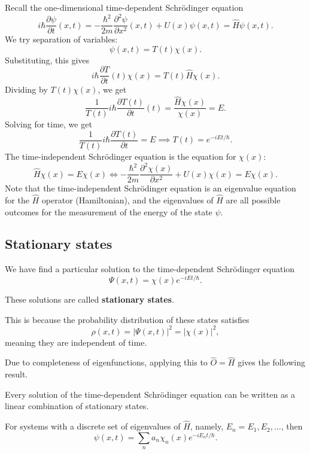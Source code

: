 \documentclass[12pt]{article}
\begin{document}
Recall the one-dimensional time-dependent Schr\"{o}dinger equation
\[
	i \hbar \frac{\partial \psi}{\partial t}(x, t) = -\frac{\hbar^2}{2m} \frac{\partial^2 \psi}{\partial x^2} (x, t) + U(x) \psi(x, t) = \hat H \psi(x, t)
.\] 
We try separation of variables:
\[
	\psi(x, t) = T(t) \chi(x)
.\]
Substituting, this gives
\[
	i \hbar \frac{\partial T}{\partial t}(t) \chi(x) = T(t) \hat H \chi(x)
.\]
Dividing by $T(t)\chi(x)$, we get
\[
	\frac{1}{T(t)} i \hbar \frac{\partial T (t)}{\partial t}(t) = \frac{\hat H \chi (x)}{\chi(x)} = E
.\]
Solving for time, we get
\[
	\frac{1}{T(t)} i \hbar \frac{\partial T(t)}{\partial t} = E \implies T(t) = e^{-i E t/\hbar}
.\]
The time-independent Schr\"{o}dinger equation is the equation for $\chi(x)$:
\[
	\hat H \chi(x) = E \chi(x) \iff - \frac{\hbar^2}{2m} \frac{\partial^2 \chi(x)}{\partial x^2} + U(x) \chi(x) = E \chi(x)
.\]
Note that the time-independent Schr\"{o}dinger equation is an eigenvalue equation for the $\hat H$ operator (Hamiltonian), and the eigenvalues of $\hat H$ are all possible outcomes for the measurement of the energy of the state $\psi$.

\subsection{Stationary states}%
\label{sub:stationary_states}

We have find a particular solution to the time-dependent Schr\"{o}dinger equation
\[
	\Psi(x, t) = \chi(x) e^{-iEt/\hbar}
.\]

\begin{definition}
	These solutions are called \textbf{stationary states}.
\end{definition}

This is because the probability distribution of these states satisfies
\[
	\rho(x, t) = |\Psi(x, t)|^2 = |\chi(x)|^2
,\]
meaning they are independent of time.

Due to completeness of eigenfunctions, applying this to $\hat O = \hat H$ gives the following result.

\begin{theorem}
	Every solution of the time-dependent Schr\"{o}dinger equation can be written as a linear combination of stationary states.
\end{theorem}

For systems with a discrete set of eigenvalues of $\hat H$, namely, $E_n = E_1, E_2, \ldots$, then
\[
	\psi(x, t) = \sum_{n} a_n \chi_n(x) e^{-iE_n t/\hbar}
.\]
\end{document}
